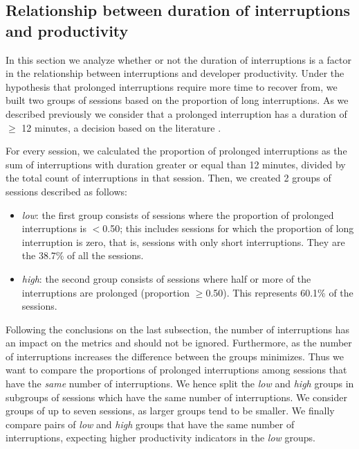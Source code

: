 \subsection{Relationship between duration of interruptions and productivity}

In this section we analyze whether or not the duration of interruptions is a factor in the relationship between interruptions and developer productivity. Under the hypothesis that prolonged interruptions require more time to recover from, we built two groups of sessions based on the proportion of long interruptions. As we described previously we consider that a prolonged interruption has a duration of $\geq$ 12 minutes, a decision based on the literature \cite{GM04, KaptelininN07}. %

For every session, we calculated the proportion of prolonged interruptions as the sum of interruptions with duration greater or equal than 12 minutes, divided by the total count of interruptions in that session. Then, we created 2 groups of sessions described as follows:

\begin{itemize}
	\item \textit{low}: the first group consists of sessions where the proportion of prolonged interruptions is $<$0.50; this includes sessions for which the proportion of long interruption is zero, that is, sessions with only short interruptions. They are the 38.7\% of all the sessions.
	\item \textit{high}: the second group consists of sessions where half or more of the interruptions are prolonged (proportion $\geq$0.50). This represents 60.1\% of the sessions.
\end{itemize} 

Following the conclusions on the last subsection, the number of interruptions has an impact on the metrics and should not be ignored. Furthermore, as the number of interruptions increases the difference between the groups minimizes.  %
Thus we want to compare the proportions of prolonged interruptions among sessions that have the \emph{same} number of interruptions. We hence split the \emph{low} and \emph{high} groups in subgroups of sessions which have the same number of interruptions. We consider groups of up to seven sessions, as larger groups tend to be smaller. We finally compare pairs of \emph{low} and \emph{high} groups that have the same number of interruptions, expecting higher productivity indicators in the \emph{low} groups.

